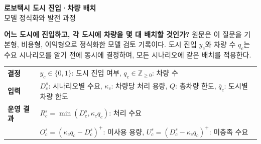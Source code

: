 \documentclass[10pt,a4paper]{article}
\newcommand{\block}[1]{\vspace{5pt}{\large\bfseries #1}\par\vspace{2pt}}
\begin{document}
\begin{center}
{\LARGE\bfseries 로보택시 도시 진입·차량 배치}\\[4pt]
{\large 모델 정식화와 발전 과정}\\[5pt]
\end{center}

\block{1. 연구 질문}
\textbf{어느 도시에 진입하고, 각 도시에 차량을 몇 대 배치할 것인가?}
원문은 이 질문을 기본형, 비용형, 이익형으로 정식화한 모델 검토 기록이다.
도시 진입 $y_c$와 차량 수 $q_c$는 수요 시나리오를 알기 전에 동시에 결정하며,
모든 시나리오에 같은 배치를 적용한다.

\block{2. 핵심 구조}
\begin{tabularx}{\linewidth}{@{}>{\bfseries}p{27mm}X@{}}
\toprule
결정 & $y_c\in\{0,1\}$: 도시 진입 여부, \quad $q_c\in\mathbb Z_{\ge0}$: 차량 수 \\
입력 & $D_c^s$: 시나리오별 수요, $\kappa_c$: 차량당 처리 용량,
$Q$: 총차량 한도, $\bar q_c$: 도시별 차량 한도 \\
운영 결과 & $R_c^s=\min(D_c^s,\kappa_c q_c)$: 처리 수요 \\
 & $O_c^s=(\kappa_c q_c-D_c^s)^+$: 미사용 용량,
$U_c^s=(D_c^s-\kappa_c q_c)^+$: 미충족 수요 \\
\bottomrule
\end{tabularx}
\end{document}
